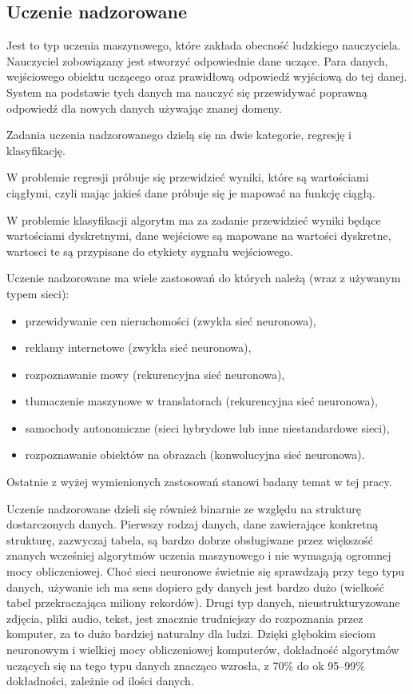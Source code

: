 \documentclass[12pt,a4paper,twoside,titlepage,openright]{book}
\begin{document}
\subsection*{Uczenie nadzorowane}
Jest to typ uczenia maszynowego, które zakłada obecność ludzkiego nauczyciela. Nauczyciel zobowiązany jest stworzyć odpowiednie dane uczące. Para danych, wejściowego obiektu uczącego oraz prawidłową odpowiedź wyjściową do tej danej. System na podstawie tych danych ma nauczyć się przewidywać poprawną odpowiedź dla nowych danych używając znanej domeny.

Zadania uczenia nadzorowanego dzielą się na dwie kategorie, regresję i klasyfikację. 

W problemie regresji próbuje się przewidzieć wyniki, które są wartościami ciągłymi, czyli mając jakieś dane próbuje się je mapować na funkcję ciągłą. 

W problemie klasyfikacji algorytm ma za zadanie przewidzieć wyniki będące wartościami dyskretnymi, dane wejściowe są mapowane na wartości dyskretne, wartosci te są przypisane do etykiety sygnału wejściowego.\cite{Gron:2017:HML:3153997}

Uczenie nadzorowane ma wiele zastosowań do których należą (wraz z używanym typem sieci):
\begin{itemize}
\item przewidywanie cen nieruchomości (zwykła sieć neuronowa),
\item reklamy internetowe (zwykła sieć neuronowa),
\item rozpoznawanie mowy (rekurencyjna sieć neuronowa),
\item tłumaczenie maszynowe w translatorach (rekurencyjna sieć neuronowa),
\item samochody autonomiczne (sieci hybrydowe lub inne niestandardowe sieci),
\item rozpoznawanie obiektów na obrazach (konwolucyjna sieć neuronowa).
\end{itemize}
Ostatnie z wyżej wymienionych zastosowań stanowi badany temat w tej pracy.

Uczenie nadzorowane dzieli się również binarnie ze względu na strukturę dostarczonych danych. Pierwszy rodzaj danych, dane zawierające konkretną strukturę, zazwyczaj tabela, są bardzo dobrze obsługiwane przez większość znanych wcześniej algorytmów uczenia maszynowego i nie wymagają ogromnej mocy obliczeniowej. Choć sieci neuronowe świetnie się sprawdzają przy tego typu danych, używanie ich ma sens dopiero gdy danych jest bardzo dużo (wielkość tabel przekraczająca miliony rekordów). Drugi typ danych, nieustrukturyzowane zdjęcia, pliki audio, tekst, jest znacznie trudniejszy do rozpoznania przez komputer, za to dużo bardziej naturalny dla ludzi. Dzięki głębokim sieciom neuronowym i wielkiej mocy obliczeniowej komputerów, dokładność algorytmów uczących się na tego typu danych znacząco wzrosła, z 70\% do ok 95--99\% dokładności, zależnie od ilości danych.
\end{document}

